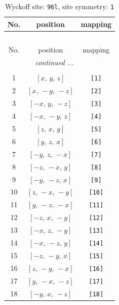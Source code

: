 \documentclass[fleqn,8pt]{jsarticle}
\begin{document}
\begin{longtable}{ccc}
\caption{Wyckoff site: {\tt 96l}, site symmetry: {\tt 1}}
 \\
 \hline \hline
No. & position & mapping \\ \hline \endfirsthead

\multicolumn{2}{l}{\tablename\ \thetable{}} \\
 \hline \hline
No. & position & mapping \\ \hline \endhead

 \hline \hline
\multicolumn{2}{r}{\footnotesize\it continued ...} \\ \endfoot

 \hline \hline
\multicolumn{2}{r}{} \\ \endlastfoot

1 & $\left[ x,\, y,\, z \right]$ & {\tt [1]} \\ \hline
2 & $\left[ x,\, - y,\, - z \right]$ & {\tt [2]} \\ \hline
3 & $\left[ - x,\, y,\, - z \right]$ & {\tt [3]} \\ \hline
4 & $\left[ - x,\, - y,\, z \right]$ & {\tt [4]} \\ \hline
5 & $\left[ z,\, x,\, y \right]$ & {\tt [5]} \\ \hline
6 & $\left[ y,\, z,\, x \right]$ & {\tt [6]} \\ \hline
7 & $\left[ - y,\, z,\, - x \right]$ & {\tt [7]} \\ \hline
8 & $\left[ - z,\, - x,\, y \right]$ & {\tt [8]} \\ \hline
9 & $\left[ - y,\, - z,\, x \right]$ & {\tt [9]} \\ \hline
10 & $\left[ z,\, - x,\, - y \right]$ & {\tt [10]} \\ \hline
11 & $\left[ y,\, - z,\, - x \right]$ & {\tt [11]} \\ \hline
12 & $\left[ - z,\, x,\, - y \right]$ & {\tt [12]} \\ \hline
13 & $\left[ - x,\, z,\, - y \right]$ & {\tt [13]} \\ \hline
14 & $\left[ - x,\, - z,\, y \right]$ & {\tt [14]} \\ \hline
15 & $\left[ - z,\, - y,\, x \right]$ & {\tt [15]} \\ \hline
16 & $\left[ z,\, - y,\, - x \right]$ & {\tt [16]} \\ \hline
17 & $\left[ y,\, - x,\, - z \right]$ & {\tt [17]} \\ \hline
18 & $\left[ - y,\, x,\, - z \right]$ & {\tt [18]} \\ \hline

\end{longtable}
\end{document}
